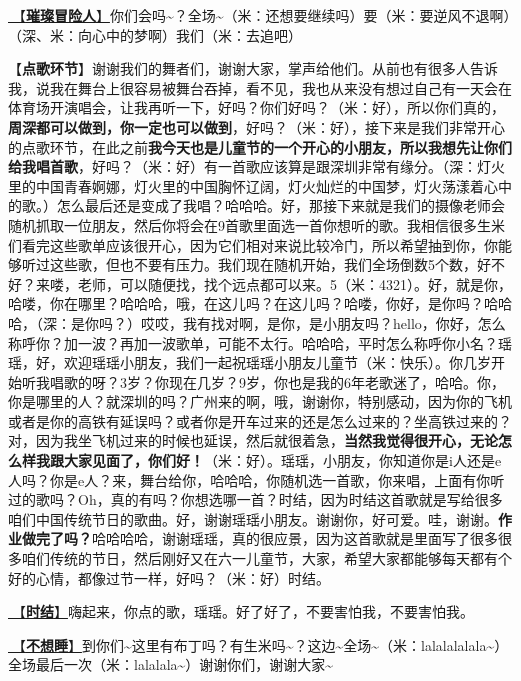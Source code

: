 \documentclass[]{ctexbook}
\begin{document}
\hyperref[adventurers]{🎵【\textbf{璀璨冒险人}】}你们会吗\textasciitilde？全场\textasciitilde（米：还想要继续吗）要（米：要逆风不退啊）（深、米：向心中的梦啊）我们（米：去追吧）

【\textbf{点歌环节}】谢谢我们的舞者们，谢谢大家，掌声给他们。从前也有很多人告诉我，说我在舞台上很容易被舞台吞掉，看不见，我也从来没有想过自己有一天会在体育场开演唱会，让我再听一下，好吗？你们好吗？（米：好），所以你们真的，\textbf{周深都可以做到，你一定也可以做到}，好吗？（米：好），接下来是我们非常开心的点歌环节，在此之前\textbf{我今天也是儿童节的一个开心的小朋友，所以我想先让你们给我唱首歌}，好吗？（米：好）有一首歌应该算是跟深圳非常有缘分。（深：灯火里的中国青春婀娜，灯火里的中国胸怀辽阔，灯火灿烂的中国梦，灯火荡漾着心中的歌。）怎么最后还是变成了我唱？哈哈哈。好，那接下来就是我们的摄像老师会随机抓取一位朋友，然后你将会在9首歌里面选一首你想听的歌。我相信很多生米们看完这些歌单应该很开心，因为它们相对来说比较冷门，所以希望抽到你，你能够听过这些歌，但也不要有压力。我们现在随机开始，我们全场倒数5个数，好不好？来喽，老师，可以随便找，找个远点都可以来。5（米：4321）。好，就是你，哈喽，你在哪里？哈哈哈，哦，在这儿吗？在这儿吗？哈喽，你好，是你吗？哈哈哈，（深：是你吗？）哎哎，我有找对啊，是你，是小朋友吗？hello，你好，怎么称呼你？加一波？再加一波歌单，可能不太行。哈哈哈，平时怎么称呼你小名？瑶瑶，好，欢迎瑶瑶小朋友，我们一起祝瑶瑶小朋友儿童节（米：快乐）。你几岁开始听我唱歌的呀？3岁？你现在几岁？9岁，你也是我的6年老歌迷了，哈哈。你，你是哪里的人？就深圳的吗？广州来的啊，哦，谢谢你，特别感动，因为你的飞机或者是你的高铁有延误吗？或者你是开车过来的还是怎么过来的？坐高铁过来的？对，因为我坐飞机过来的时候也延误，然后就很着急，\textbf{当然我觉得很开心，无论怎么样我跟大家见面了，你们好！}（米：好）。瑶瑶，小朋友，你知道你是i人还是e人吗？你是e人？来，舞台给你，哈哈哈，你随机选一首歌，你来唱，上面有你听过的歌吗？Oh，真的有吗？你想选哪一首？时结，因为时结这首歌就是写给很多咱们中国传统节日的歌曲。好，谢谢瑶瑶小朋友。谢谢你，好可爱。哇，谢谢。\textbf{作业做完了吗？}哈哈哈哈，谢谢瑶瑶，真的很应景，因为这首歌就是里面写了很多很多咱们传统的节日，然后刚好又在六一儿童节，大家，希望大家都能够每天都有个好的心情，都像过节一样，好吗？（米：好）时结。

\hyperref[shijie]{🎵【\textbf{时结}】}嗨起来，你点的歌，瑶瑶。好了好了，不要害怕我，不要害怕我。

\hyperref[donot-want-to-sleep]{🎵【\textbf{不想睡}】}到你们\textasciitilde 这里有布丁吗？有生米吗\textasciitilde？这边\textasciitilde 全场\textasciitilde（米：lalalalalala\textasciitilde）全场最后一次（米：lalalala\textasciitilde）谢谢你们，谢谢大家\textasciitilde{}
\end{document}

